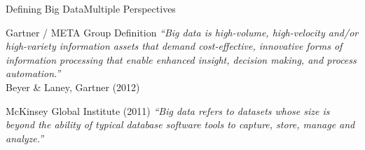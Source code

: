 \documentclass[aspectratio=169,10pt]{beamer}
\begin{document}
\begin{frame}{Defining Big Data\textemdash Multiple Perspectives}
      \vspace{4pt}
      \begin{block}{Gartner / META Group Definition}
        \small\textit{``Big data is high-volume, high-velocity and/or high-variety information assets that demand cost-effective, innovative forms of information processing that enable enhanced insight, decision making, and process automation.''}\\
        \hfill\textemdash Beyer \& Laney, Gartner (2012)
      \end{block}
      \vspace{4pt}
      \begin{block}{McKinsey Global Institute (2011)}
        \small\textit{``Big data refers to datasets whose size is beyond the ability of typical database software tools to capture, store, manage and analyze.''}
      \end{block}

\end{frame}
\end{document}
